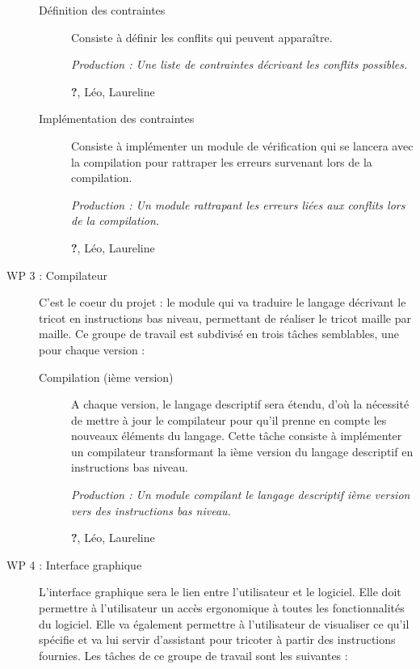 \documentclass{article}
\begin{document}
\begin{description}
    \begin{description}
    \item[Définition des contraintes] Consiste à définir les conflits qui peuvent apparaître.
      
      \textit{Production : Une liste de contraintes décrivant les conflits possibles.}

      \textbf{?}, Léo, Laureline

    \item[Implémentation des contraintes] Consiste à implémenter un module de vérification qui se lancera avec la compilation pour 
rattraper les erreurs survenant lors de la compilation.
      
      \textit{Production : Un module rattrapant les erreurs liées aux conflits lors de la compilation.}

      \textbf{?}, Léo, Laureline

    \end{description}

\medskip

\item[WP 3 : Compilateur] C'est le coeur du projet : le module qui va traduire le langage décrivant le tricot en instructions 
bas niveau, permettant de réaliser le tricot maille par maille. Ce groupe de travail est subdivisé en trois tâches semblables, une pour 
chaque version :

    \begin{description}
    \item[Compilation (ième version)] A chaque version, le langage descriptif sera étendu, d'où la nécessité de mettre à jour le 
compilateur pour qu'il prenne en compte les nouveaux éléments du langage. Cette tâche consiste à implémenter un compilateur transformant 
la ième version du langage descriptif en instructions bas niveau.

      \textit{Production : Un module compilant le langage descriptif ième version vers des instructions bas niveau.}

      \textbf{?}, Léo, Laureline %
    \end{description}

\medskip

\item[WP 4 : Interface graphique] L'interface graphique sera le lien entre l'utilisateur et le logiciel. Elle doit permettre à 
l'utilisateur un accès ergonomique à toutes les fonctionnalités du logiciel. Elle va également permettre à l'utilisateur de visualiser ce 
qu'il spécifie et va lui servir d'assistant pour tricoter à partir des instructions fournies. Les tâches de ce groupe de travail sont les 
suivantes :


\end{description}
\end{document}
